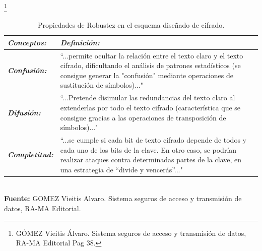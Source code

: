 \documentclass[a4paper,openright,12pt]{book}
\theoremstyle{definition}
\theoremstyle{remark}
\begin{document}
\begin{table}[ht]
\centering
\caption{Propiedades de Robustez en el esquema diseñado de cifrado.}\footnote{GÓMEZ Vieitis Álvaro. Sistema seguros de acceso y transmisión de datos, RA-MA Editorial Pag 38.}
\begin{tabular}{>{\centering\arraybackslash}m{3cm} >{\arraybackslash}m{10cm} }
\hline
\textbf{\textit{Conceptos:}} & \textbf{\textit{Definición:}} \\ \hline
\textbf{\textit{Confusión:}} & “...permite ocultar la relación entre el texto claro y el texto cifrado, dificultando el análisis de patrones estadísticos (se consigue generar la "confusión" mediante operaciones de sustitución de símbolos)..." \\ \hline
\textbf{\textit{Difusión:}} & “...Pretende disimular las redundancias del texto claro al extenderlas por todo el texto cifrado (característica que se consigue gracias a las operaciones de transposición de símbolos)..." \\ \hline
\textbf{\textit{Completitud:}} & “...se cumple si cada bit de texto cifrado depende de todos y cada uno de los bits de la clave. En otro caso, se podrían realizar ataques contra determinadas partes de la clave, en una estrategia de “divide y vencerás”..." \\ \hline
\end{tabular}
\label{tabla:RobustezPropiedades}
\\\textbf{Fuente:} GOMEZ Vieitis Alvaro. Sistema seguros de acceso y transmisión de datos, RA-MA Editorial.
\end{table}
\end{document}
